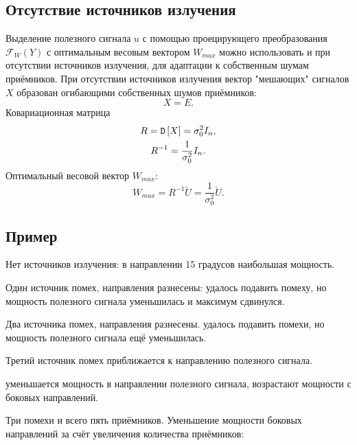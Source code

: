 \subsection{Отсутствие источников излучения}

Выделение полезного сигнала $u$ с помощью проецирующего преобразования $\mathcal{F}_W(Y)$ с оптимальным весовым вектором $W_{max}$ можно использовать и при отсутствии источников
излучения, для адаптации к собственным шумам приёмников. При отсутствии источников излучения вектор "мешающих"{} сигналов $X$ образован огибающими собственных шумов приёмников:
\[
    X = E .
\]
Ковариационная матрица
\begin{gather*}
    R = \mathtt{D} \left [ X \right ] = \sigma_0^2 I_n , \\
    R^{-1} = \frac{1}{\sigma_0^2} I_n .
\end{gather*}
Оптимальный весовой вектор $W_{max}$:
\[
    W_{max}
    = R^{-1} \breve{U}
    = \frac{1}{\sigma_0^2} \breve{U} .
\]

\subsection{Пример}

Нет источников излучения:
\noindent в направлении 15 градусов наибольшая мощность.

Один источник помех, направления разнесены:
\noindent удалось подавить помеху, но мощность полезного сигнала уменьшилась и максимум сдвинулся.

Два источника помех, направления разнесены.
\noindent удалось подавить помехи, но мощность полезного сигнала ещё уменьшилась.

Третий источник помех приближается к направлению полезного сигнала.
\begin{Matlab}
\end{Matlab}
\noindent уменьшается мощность в направлении полезного сигнала, возрастают мощности с боковых направлений.

Три помехи и всего пять приёмников. Уменьшение мощности боковых направлений за счёт увеличения количества приёмников:
\begin{Matlab}
\end{Matlab}


